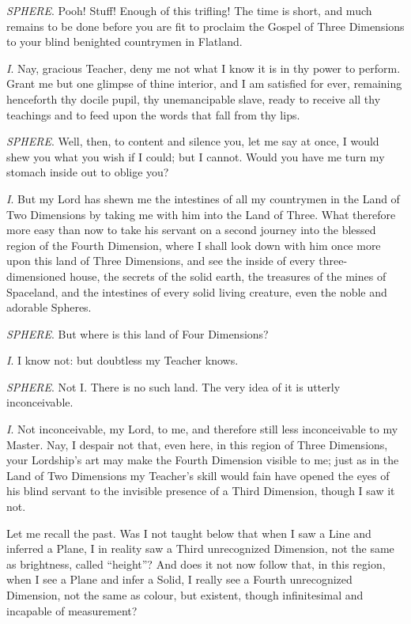 \documentclass[10pt, kindle, oneside]{kindle}
\begin{document}
\emph{SPHERE}. Pooh! Stuff! Enough of this trifling! The time is short, and much
remains to be done before you are fit to proclaim the Gospel of Three
Dimensions to your blind benighted countrymen in Flatland.

\emph{I}. Nay, gracious Teacher, deny me not what I know it is in thy power to
perform. Grant me but one glimpse of thine interior, and I am satisfied for
ever, remaining henceforth thy docile pupil, thy unemancipable slave, ready to
receive all thy teachings and to feed upon the words that fall from thy lips.

\emph{SPHERE}. Well, then, to content and silence you, let me say at once, I would
shew you what you wish if I could; but I cannot. Would you have me turn my
stomach inside out to oblige you?

\emph{I}. But my Lord has shewn me the intestines of all my countrymen in the Land of
Two Dimensions by taking me with him into the Land of Three. What therefore
more easy than now to take his servant on a second journey into the blessed
region of the Fourth Dimension, where I shall look down with him once more
upon this land of Three Dimensions, and see the inside of every
three-dimensioned house, the secrets of the solid earth, the treasures of the
mines of Spaceland, and the intestines of every solid living creature, even
the noble and adorable Spheres.

\emph{SPHERE}. But where is this land of Four Dimensions?

\emph{I}. I know not: but doubtless my Teacher knows.

\emph{SPHERE}. Not I. There is no such land. The very idea of it is utterly
inconceivable.

\emph{I}. Not inconceivable, my Lord, to me, and therefore still less inconceivable
to my Master. Nay, I despair not that, even here, in this region of Three
Dimensions, your Lordship's art may make the Fourth Dimension visible to me;
just as in the Land of Two Dimensions my Teacher's skill would fain have
opened the eyes of his blind servant to the invisible presence of a Third
Dimension, though I saw it not.

Let me recall the past. Was I not taught below that when I saw a Line and
inferred a Plane, I in reality saw a Third unrecognized Dimension, not the
same as brightness, called ``height''? And does it not now follow that, in this
region, when I see a Plane and infer a Solid, I really see a Fourth
unrecognized Dimension, not the same as colour, but existent, though
infinitesimal and incapable of measurement?
\end{document}
